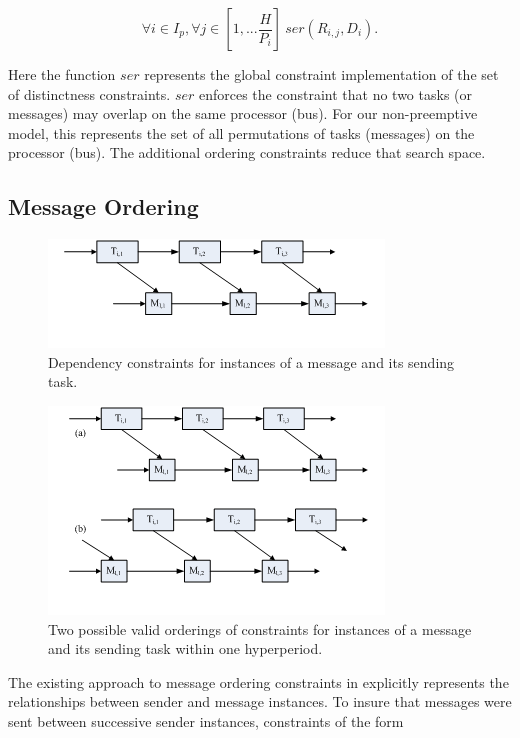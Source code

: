 \begin{equation}
\forall i \in I_p ,\forall j \in [1,...\frac{H}{{P_i}}]\ ser(R_{i,j}, D_i ).
\end{equation}

Here the function $ser$ represents the global constraint implementation of the set of distinctness 
constraints.  $ser$ enforces the constraint that no two tasks (or messages) may overlap on the same 
processor (bus).  For our non-preemptive model, this represents the set of all permutations of tasks 
(messages) on the processor (bus).  The additional ordering constraints reduce that search space.

\subsection{Message Ordering}

\begin{figure}
	\includegraphics[scale=.6]{figures/ordering.png}
	\centering
	\caption{Dependency constraints for instances of a message and its sending task.}
	\label{fig:ordering}
\end{figure}

\begin{figure}
	\includegraphics[scale=.6]{figures/possibilities.png}
	\centering
	\caption{Two possible valid orderings of constraints for instances of a message and its sending task within one hyperperiod.}
	\label{fig:possibilities}
\end{figure}

The existing approach to message ordering constraints in \cite{sched:offline} explicitly represents the 
relationships between sender and message instances.  To insure that messages were sent between successive 
sender instances, constraints of the form 

